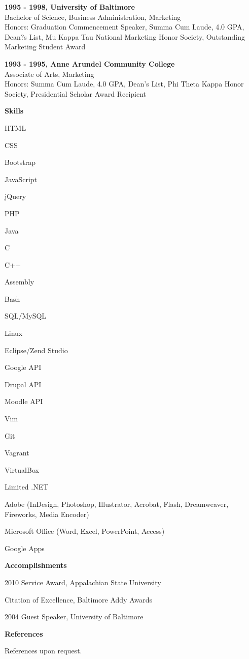 \documentclass[a4paper,12pt,final]{memoir}
\newcommand{\Sep}{\vspace{1.5em}}
\newcommand{\SmallSep}{\vspace{0.5em}}
\newcommand{\CVSection}[1]
	{\Large\textbf{#1}\par
	\SmallSep\normalsize\normalfont}
\newcommand{\CVItem}[1]
	{\textbf{\color{BrickRed} #1}}
\begin{document}
\CVItem{1995 - 1998, University of Baltimore}\\
Bachelor of Science, Business Administration, Marketing\\
Honors: Graduation Commencement Speaker, Summa Cum Laude, 4.0 GPA, Dean?s List, Mu Kappa Tau National Marketing Honor Society, Outstanding Marketing Student Award
\SmallSep

\CVItem{1993 - 1995, Anne Arundel Community College}\\
Associate of Arts, Marketing\\
Honors: Summa Cum Laude, 4.0 GPA, Dean's List, Phi Theta Kappa Honor Society, Presidential Scholar Award Recipient
\Sep

\clearpage
\framebreak
\framebreak

\CVSection{Skills}
\begin{multicols}{3}
\begin{compactitem}[\color{BrickRed}$\circ$]
	\item HTML
	\item CSS
	\item Bootstrap
	\item JavaScript
	\item jQuery
	\item PHP
	\item Java
	\item C
	\item C++
	\item Assembly
	\item Bash
	\item SQL/MySQL
	\item Linux
	\item Eclipse/Zend Studio
	\item Google API
	\item Drupal API
	\item Moodle API
	\item Vim
	\item Git
	\item Vagrant
	\item VirtualBox
	\item Limited .NET
	\item Adobe (InDesign, Photoshop, Illustrator, Acrobat, Flash, Dreamweaver, Fireworks, Media Encoder)
	\item Microsoft Office (Word, Excel, PowerPoint, Access)
	\item Google Apps 
\end{compactitem}
\end{multicols}
\Sep 

\CVSection{Accomplishments}
\begin{compactitem}[\color{BrickRed}$\circ$]
	\item 2010 Service Award, Appalachian State University
	\item Citation of Excellence, Baltimore Addy Awards
	\item 2004 Guest Speaker, University of Baltimore
\end{compactitem}
\Sep

\CVSection{References}
References upon request.

\end{document}
